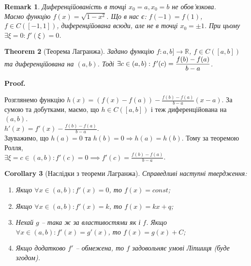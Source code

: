 \documentclass[a4paper, 14pt]{article}
\makeatletter
\def\qed{$\blacksquare$}
\theoremstyle{theoremdd}
\newtheorem{theorem}{Theorem}[subsection]
\theoremstyle{theoremdd}
\theoremstyle{theoremdd}
\theoremstyle{theoremdd}
\theoremstyle{theoremdd}
\theoremstyle{theoremdd}
\newtheorem{remark}[theorem]{Remark}
\theoremstyle{theoremdd}
\theoremstyle{theoremdd}
\newtheorem{corollary}[theorem]{Corollary}
\renewenvironment{proof}[1][Proof.\\]{\par
\pushQED{\hfill \qed}%
\normalfont \topsep6\p@\@plus6\p@\relax
\trivlist
\item\relax
{\bfseries
#1\@addpunct{.}}\hspace\labelsep\ignorespaces
}{%
\popQED\endtrivlist\@endpefalse
}
\makeatother
\begin{document}
\begin{remark}
Диференційованість в точці $x_0=a,x_0=b$ не обов'язкова.\\
Маємо функцію $f(x) = \sqrt{1-x^2}$. Що в нас є: $f(-1) = f(1)$, $f \in C([-1,1])$, диференційована всюди, але не в точці $x_0 = \pm 1$. При цьому $\exists \xi = 0: f'(\xi) = 0$.
\end{remark}

\begin{theorem}[Теорема Лагранжа]
Задано функцію $f \colon a,b] \to \mathbb{R}$, $f \in C([a,b])$ та диференційована на $(a,b)$. Тоді $\exists c \in (a,b): \\ f'(c) = \displaystyle \frac{f(b)-f(a)}{b-a}$.
\end{theorem}

\begin{proof}
Розглянемо функцію $h(x) = \displaystyle (f(x)-f(a))- \frac{f(b)-f(a)}{b-a}(x-a)$. За сумою та добутками, маємо, що $h \in C([a,b])$ і теж диференційована на $(a,b)$.\\
$h'(x) = \displaystyle f'(x) - \frac{f(b)-f(a)}{b-a}$.\\
Зауважимо, що $h(a) = 0$ та $h(b) = 0 \Rightarrow h(a) = h(b)$. Тому за теоремою Ролля, \\
$\exists \xi = c \in (a,b): f'(c) = 0 \implies f'(c) = \displaystyle \frac{f(b)-f(a)}{b-a}$.
\\ %
\end{proof}

\begin{corollary}[Наслідки з теореми Лагранжа]
Справедливі наступні твердження:
\begin{enumerate}[nosep,wide=0pt,label={\arabic*)}]
\item Якщо $\forall x \in (a,b): f'(x) = 0$, то $f(x) = const$;
\item Якщо $\forall x \in (a,b): f'(x) = k$, то $f(x) = kx + q$;
\item Нехай $g$ -- така ж за властивостями як і $f$. Якщо $\forall x \in (a,b): f'(x) = g'(x)$, то $f(x) = g(x) + C$;
\item Якщо додатково $f'$ -- обмежена, то $f$ задовольняє умові Ліпшиця (буде згодом).
\end{enumerate}
\end{corollary}
\end{document}
